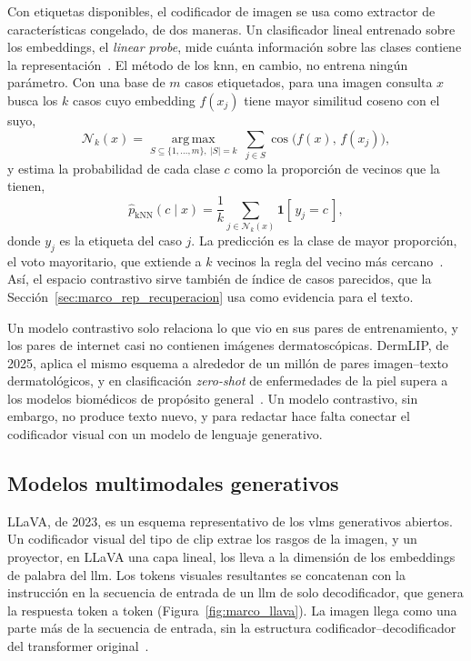 Con etiquetas disponibles, el codificador de imagen se usa como extractor de características congelado, de dos
maneras. Un clasificador lineal entrenado sobre los embeddings, el \emph{linear probe}, mide cuánta información
sobre las clases contiene la representación~\cite{radford2021learning}. El método de los \gls{knn}, en cambio,
no entrena ningún parámetro. Con una base de $m$ casos etiquetados, para una imagen consulta $x$ busca los $k$
casos cuyo embedding $f(x_j)$ tiene mayor similitud coseno con el suyo,
\begin{equation}
    \mathcal{N}_k(x) = \operatorname*{arg\,max}_{S \subseteq \{1,\dots,m\},\ |S| = k}\ \sum_{j \in S}
    \cos\bigl(f(x),\, f(x_j)\bigr),
    \label{eq:marco_vecinos}
\end{equation}
y estima la probabilidad de cada clase $c$ como la proporción de vecinos que la tienen,
\begin{equation}
    \hat{p}_{\text{kNN}}(c \mid x) = \frac{1}{k}\sum_{j \in \mathcal{N}_k(x)} \mathbf{1}[\,y_j = c\,],
    \label{eq:marco_knn}
\end{equation}
donde $y_j$ es la etiqueta del caso $j$. La predicción es la clase de mayor proporción, el voto mayoritario,
que extiende a $k$ vecinos la regla del vecino más cercano~\cite{cover1967nearest}. Así, el espacio contrastivo sirve también de índice de casos parecidos,
que la Sección~\ref{sec:marco_rep_recuperacion} usa como evidencia para el texto.

Un modelo contrastivo solo relaciona lo que vio en sus pares de entrenamiento, y los pares de internet
casi no contienen imágenes dermatoscópicas. DermLIP, de 2025, aplica el mismo esquema a alrededor de un millón
de pares imagen--texto dermatológicos, y en clasificación \emph{zero-shot} de enfermedades de la piel supera a
los modelos biomédicos de propósito general~\cite{yan2025derm1miccv}. Un modelo contrastivo, sin embargo, no
produce texto nuevo, y para redactar hace falta conectar el codificador visual con un modelo de lenguaje
generativo.

\subsection{Modelos multimodales generativos}
\label{sec:marco_vlm_generativos}

LLaVA, de 2023, es un esquema representativo de los \glspl{vlm} generativos abiertos. Un codificador
visual del tipo de \gls{clip} extrae los rasgos de la imagen, y un proyector, en LLaVA una capa lineal, los
lleva a la dimensión de los embeddings de palabra del \gls{llm}. Los tokens visuales resultantes se concatenan
con la instrucción en la secuencia de entrada de un \gls{llm} de solo decodificador, que genera la
respuesta token a token (Figura~\ref{fig:marco_llava}). La imagen llega como una parte más de la secuencia de
entrada, sin la estructura codificador--decodificador del transformer original~\cite{liu2023visual}.

